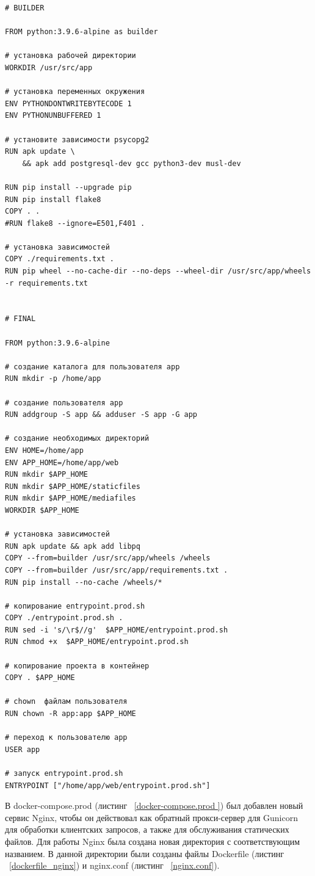 \begin{lstlisting}[frame=single, label={dockerfile.prod}, caption={\textsf{Dockerfile.prod}}, language=Dockerfile.prod] 
# BUILDER

FROM python:3.9.6-alpine as builder

# установка рабочей директории
WORKDIR /usr/src/app

# установка переменных окружения
ENV PYTHONDONTWRITEBYTECODE 1
ENV PYTHONUNBUFFERED 1

# установите зависимости psycopg2
RUN apk update \
    && apk add postgresql-dev gcc python3-dev musl-dev

RUN pip install --upgrade pip
RUN pip install flake8
COPY . .
#RUN flake8 --ignore=E501,F401 .

# установка зависимостей
COPY ./requirements.txt .
RUN pip wheel --no-cache-dir --no-deps --wheel-dir /usr/src/app/wheels -r requirements.txt


# FINAL

FROM python:3.9.6-alpine

# создание каталога для пользователя app
RUN mkdir -p /home/app

# создание пользователя app
RUN addgroup -S app && adduser -S app -G app

# создание необходимых директорий
ENV HOME=/home/app
ENV APP_HOME=/home/app/web
RUN mkdir $APP_HOME
RUN mkdir $APP_HOME/staticfiles
RUN mkdir $APP_HOME/mediafiles
WORKDIR $APP_HOME

# установка зависимостей
RUN apk update && apk add libpq
COPY --from=builder /usr/src/app/wheels /wheels
COPY --from=builder /usr/src/app/requirements.txt .
RUN pip install --no-cache /wheels/*

# копирование entrypoint.prod.sh
COPY ./entrypoint.prod.sh .
RUN sed -i 's/\r$//g'  $APP_HOME/entrypoint.prod.sh
RUN chmod +x  $APP_HOME/entrypoint.prod.sh

# копирование проекта в контейнер
COPY . $APP_HOME

# chown  файлам пользователя
RUN chown -R app:app $APP_HOME

# переход к пользователю app
USER app

# запуск entrypoint.prod.sh
ENTRYPOINT ["/home/app/web/entrypoint.prod.sh"]
\end{lstlisting}
	В \textsf{docker-compose.prod} (листинг ~\ref{docker-compose.prod }) был добавлен новый сервис \textsf{Nginx}, чтобы он действовал как обратный прокси-сервер для \textsf{Gunicorn} для обработки клиентских запросов, а также для обслуживания статических файлов. Для работы \textsf{Nginx} была создана новая директория с соответствующим названием. В данной директории были созданы файлы \textsf{Dockerfile} (листинг ~\ref{dockerfile_nginx}) и \textsf{nginx.conf} (листинг  ~\ref{nginx.conf}).

